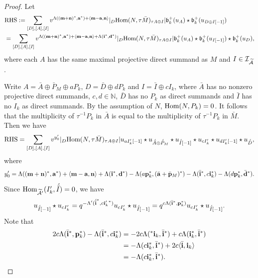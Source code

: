 \documentclass[reqno,12pt]{amsart}
\numberwithin{equation}{section}
\def\lr#1{\langle #1\rangle} \def\fin{\hfill$\square$}  \def\lra{\longrightarrow} \def\mod{\mbox{\rm \textbf{mod}}\,}\def\Mod{\mbox{\rm mod}\,}\def\top{\mbox{\rm top}\,}\def\soc{\mbox{\rm soc}\,}
\theoremstyle{plain} %
\theoremstyle{definition} %
\begin{document}
\begin{proof}
Let
	\begin{align*}
		&{\rm RHS}:=\sum_{[D],[A],[I]}v^{\Lambda(({\bf m}+{\bf n})^\ast, {\bf a}^\ast)+\lr{{\bf m}-{\bf a},{\bf n}}}|_D\Hom(N,\tau \bar{M})_{\tau A\oplus I}|\mathfrak{b}_k^+(u_A)\star \mathfrak{b}_k^+(u_{D\oplus I[-1]})\\
&=\sum_{[D],[A],[I]}v^{\Lambda(({\bf m}+{\bf n})^\ast, {\bf a}^\ast)+\lr{{\bf m}-{\bf a},{\bf n}}+\Lambda({\bf i}^\ast,{\bf d}^\ast)}|_D\Hom(N,\tau \bar{M})_{\tau A\oplus I}|\mathfrak{b}_k^+(u_A)\star \mathfrak{b}_k^+(u_{I[-1]})\star \mathfrak{b}_k^+(u_{D}),
	\end{align*}
where each $A$ has the same maximal projective direct summand as $M$ and $I\in\mathcal{I}_{\widetilde{\mathcal{A}}}$.

Write $A=\bar{A}\oplus \bar{P}_M\oplus aP_k$, $D=\bar{D}\oplus dP_k$ and $I=\bar{I}\oplus cI_k$, where $\bar{A}$ has no nonzero projective direct summands, $c,d\in\mathbb{N}$, $\bar{D}$ has no $P_k$ as direct summands and $\bar{I}$ has no $I_k$ as direct summands. By the assumption of $N$, $\mbox{\rm Hom}(N,P_k)=0$. It follows that the multiplicity of $\tau^{-1}P_k$ in $\bar{A}$ is equal to the multiplicity of $\tau^{-1}P_k$ in $\bar{M}$. Then we have
\begin{align*}
{\rm RHS}=\sum_{[D],[A],[I]}v^{y'_0}|_D\mbox{\rm Hom}(N,\tau \bar{M})_{\tau A\oplus I}|u_{aI_k'[-1]}\star u_{\acute{\bar{A}}\oplus \acute{\bar{P}}_M}\star u_{\acute{\bar{I}}[-1]}\star u_{cI'_k}\star u_{dI_k'[-1]}\star u_{\acute{\bar{D}}},
\end{align*}
where
\begin{align*}
y'_0=\Lambda(({\bf m}+{\bf n})^\ast, {\bf a}^\ast)+\lr{{\bf m}-{\bf a},{\bf n}}+\Lambda({\bf i}^\ast,{\bf d}^\ast)-\Lambda(a{\bf p}_k^\ast,(\bar{\bf a}+\bar{\bf p}_M)^\ast)-\Lambda(\bar{\bf i}^\ast,c{\bf i}_k^\ast)-\Lambda(d{\bf p}_k^\ast, \bar{\bf d}^\ast).
\end{align*}
Since $\mbox{\rm Hom}_{\widetilde{\mathcal{A}'}}(I'_k,\acute{\bar{I}})=0$, we have
$$u_{\acute{\bar{I}}[-1]}\star u_{cI'_k}=q^{-\Lambda'({\acute{\bar{{\bf i}}}}^\ast,c{{\bf i}'_k}^\ast)}u_{cI'_k}\star u_{\acute{\bar{I}}[-1]}=q^{c\Lambda({\bar{{\bf i}}}^\ast,{\bf p}_k^\ast)}u_{cI'_k}\star u_{\acute{\bar{I}}[-1]}.$$
Note that
\begin{align*}2c\Lambda({\bar{{\bf i}}}^\ast,{\bf p}_k^\ast)-\Lambda(\bar{\bf i}^\ast,c{\bf i}_k^\ast)&=-2c\Lambda(^\ast{\bf i}_k,{\bar{{\bf i}}}^\ast)+c\Lambda({\bf i}_k^\ast,\bar{\bf i}^\ast)\\&=-\Lambda(c{\bf i}_k^\ast,\bar{\bf i}^\ast)+2c\lr{\bar{\bf i},{\bf i}_k}\\&=-\Lambda(c{\bf i}_k^\ast,\bar{\bf i}^\ast).\end{align*}

\end{proof}
\end{document}
